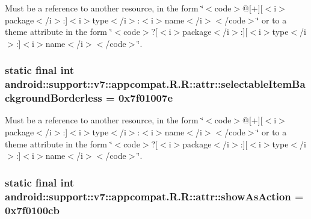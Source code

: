 Must be a reference to another resource, in the form \char`\"{}$<$code$>$@\mbox{[}+\mbox{]}\mbox{[}$<$i$>$package$<$/i$>$:\mbox{]}$<$i$>$type$<$/i$>$:$<$i$>$name$<$/i$>$$<$/code$>$\char`\"{} or to a theme attribute in the form \char`\"{}$<$code$>$?\mbox{[}$<$i$>$package$<$/i$>$:\mbox{]}\mbox{[}$<$i$>$type$<$/i$>$:\mbox{]}$<$i$>$name$<$/i$>$$<$/code$>$\char`\"{}. \hypertarget{classandroid_1_1support_1_1v7_1_1appcompat_1_1_r_1_1attr_7f6aabc14f296518af71695b9eaf1d9f}{
\subsubsection[{selectableItemBackgroundBorderless}]{\setlength{\rightskip}{0pt plus 5cm}static final int android::support::v7::appcompat.R.R::attr::selectableItemBackgroundBorderless = 0x7f01007e}}
\label{classandroid_1_1support_1_1v7_1_1appcompat_1_1_r_1_1attr_7f6aabc14f296518af71695b9eaf1d9f}


Must be a reference to another resource, in the form \char`\"{}$<$code$>$@\mbox{[}+\mbox{]}\mbox{[}$<$i$>$package$<$/i$>$:\mbox{]}$<$i$>$type$<$/i$>$:$<$i$>$name$<$/i$>$$<$/code$>$\char`\"{} or to a theme attribute in the form \char`\"{}$<$code$>$?\mbox{[}$<$i$>$package$<$/i$>$:\mbox{]}\mbox{[}$<$i$>$type$<$/i$>$:\mbox{]}$<$i$>$name$<$/i$>$$<$/code$>$\char`\"{}. \hypertarget{classandroid_1_1support_1_1v7_1_1appcompat_1_1_r_1_1attr_b594cc2886740d8047bc817f3ca6425c}{
\subsubsection[{showAsAction}]{\setlength{\rightskip}{0pt plus 5cm}static final int android::support::v7::appcompat.R.R::attr::showAsAction = 0x7f0100cb}}
\label{classandroid_1_1support_1_1v7_1_1appcompat_1_1_r_1_1attr_b594cc2886740d8047bc817f3ca6425c}


